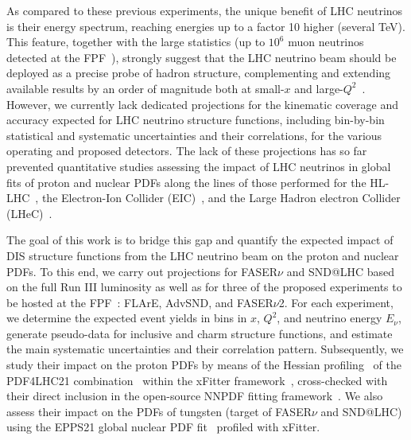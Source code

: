 As compared to these previous experiments,
the unique benefit of LHC neutrinos is their energy spectrum, reaching
energies up to a factor 10 higher (several TeV).
%
This feature, together with the large statistics (up to $10^6$ muon neutrinos detected at the FPF~\cite{Kling:2021gos}),  strongly suggest that the LHC  neutrino beam should be
deployed as a precise probe of hadron structure, complementing
and extending available results by an order of magnitude both at small-$x$
and large-$Q^2$~\cite{Feng:2022inv}.
%
However, we currently lack  dedicated projections for the kinematic coverage
and accuracy expected for LHC neutrino structure functions,
including bin-by-bin statistical and systematic uncertainties and their
correlations, for the various operating and proposed detectors.
%
The lack of these projections
has so far prevented quantitative studies assessing the impact
of LHC neutrinos in global fits of proton and nuclear PDFs along the lines
of those performed for the HL-LHC~\cite{AbdulKhalek:2018rok}, the Electron-Ion Collider (EIC)~\cite{AbdulKhalek:2021gbh,Khalek:2021ulf}, and the
Large Hadron electron Collider (LHeC)~\cite{AbdulKhalek:2019mps,LHeC:2020van}. 

The goal of this work is to bridge this gap and quantify
the expected impact of  DIS structure functions from the LHC
neutrino beam on the proton and nuclear PDFs.
%
To this end, we carry out projections for  FASER$\nu$ and SND@LHC based on the full Run III luminosity
as well as for  three of the proposed experiments to be hosted
at the FPF~\cite{Anchordoqui:2021ghd,Feng:2022inv}: FLArE, AdvSND, and FASER$\nu$2.
%
For each experiment, we determine the expected event yields in bins in $x$, $Q^2$,
and neutrino energy $E_\nu$,
generate pseudo-data for  inclusive and charm 
structure functions, 
and estimate the main systematic uncertainties and their correlation pattern.
%
Subsequently, we study their impact on the proton PDFs by means of the Hessian profiling~\cite{Paukkunen:2014zia}
of the PDF4LHC21 combination~\cite{PDF4LHCWorkingGroup:2022cjn}
within the  {\sc\small xFitter} framework~\cite{Alekhin:2014irh}, cross-checked
with their direct inclusion in the open-source NNPDF fitting framework~\cite{NNPDF:2021uiq}.
%
We also assess their impact on the PDFs of tungsten (target of FASER$\nu$ and SND@LHC)
using the EPPS21 global nuclear PDF fit~\cite{Eskola:2021nhw}
profiled with {\sc\small xFitter}.

